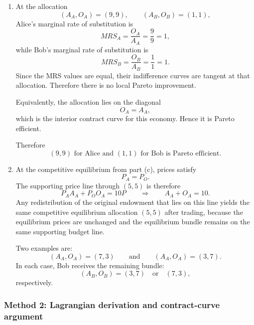 \documentclass[12pt]{article}
\begin{document}
\begin{enumerate}[label=(\alph*)]
\begin{center}
\end{center}
    \item
    At the allocation
    \[
    (A_A,O_A)=(9,9),\qquad (A_B,O_B)=(1,1),
    \]
    Alice's marginal rate of substitution is
    \[
    MRS_A=\frac{O_A}{A_A}=\frac{9}{9}=1,
    \]
    while Bob's marginal rate of substitution is
    \[
    MRS_B=\frac{O_B}{A_B}=\frac{1}{1}=1.
    \]
    Since the MRS values are equal, their indifference curves are tangent at that allocation. Therefore there is no local Pareto improvement.

    Equivalently, the allocation lies on the diagonal
    \[
    O_A=A_A,
    \]
    which is the interior contract curve for this economy. Hence it is Pareto efficient.

    Therefore
    \[
    \boxed{(9,9)\text{ for Alice and }(1,1)\text{ for Bob is Pareto efficient.}}
    \]

    \item
    At the competitive equilibrium from part (c), prices satisfy
    \[
    P_A=P_O.
    \]
    The supporting price line through \((5,5)\) is therefore
    \[
    P_A A_A + P_O O_A = 10P
    \qquad\Longrightarrow\qquad
    A_A+O_A=10.
    \]
    Any redistribution of the original endowment that lies on this line yields the same competitive equilibrium allocation \((5,5)\) after trading, because the equilibrium prices are unchanged and the equilibrium bundle remains on the same supporting budget line.

    Two examples are:
    \[
    \boxed{(A_A,O_A)=(7,3)}
    \qquad\text{and}\qquad
    \boxed{(A_A,O_A)=(3,7).}
    \]
    In each case, Bob receives the remaining bundle:
    \[
    (A_B,O_B)=(3,7)\quad\text{or}\quad (7,3),
    \]
    respectively.
\end{enumerate}

\newpage
\subsubsection{Method 2: Lagrangian derivation and contract-curve argument}
\end{document}
